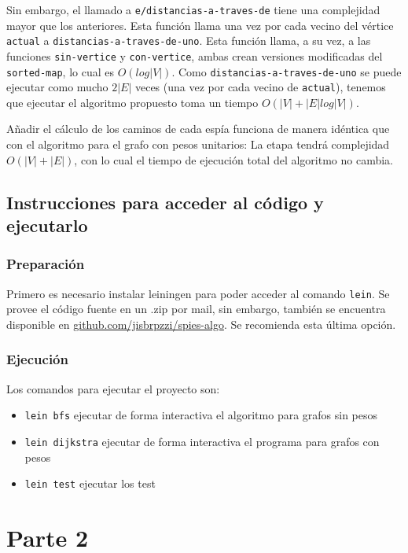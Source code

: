 \documentclass{article}
\begin{document}
Sin embargo, el llamado a \texttt{e/distancias-a-traves-de} tiene una complejidad mayor que los anteriores. Esta función llama una vez por cada vecino del vértice \texttt{actual} a \texttt{distancias-a-traves-de-uno}. Esta función llama, a su vez, a las funciones \texttt{sin-vertice} y \texttt{con-vertice}, ambas crean versiones modificadas del \texttt{sorted-map}, lo cual es $O(log |V|)$. Como \texttt{distancias-a-traves-de-uno} se puede ejecutar como mucho $2|E|$ veces (una vez por cada vecino de \texttt{actual}), tenemos que ejecutar el algoritmo propuesto toma un tiempo $O(|V| + |E| log|V|)$.

Añadir el cálculo de los caminos de cada espía funciona de manera idéntica que con el algoritmo para el grafo con pesos unitarios: La etapa tendrá complejidad $O(|V| + |E|)$, con lo cual el tiempo de ejecución total del algoritmo no cambia.

\subsection{Instrucciones para acceder al código y ejecutarlo}

\subsubsection{Preparación}
Primero es necesario instalar leiningen para poder acceder al comando \texttt{lein}. Se provee el código fuente en un .zip por mail, sin embargo, también se encuentra disponible en \href{http://github.com/jisbruzzi/spies-algo}{github.com/jisbrpzzi/spies-algo}. Se recomienda esta última opción.

\subsubsection{Ejecución}
Los comandos para ejecutar el proyecto son:

\begin{itemize}

\item \texttt{lein bfs} ejecutar de forma interactiva el algoritmo para grafos sin pesos
\item \texttt{lein dijkstra} ejecutar de forma interactiva el programa para grafos con pesos
\item \texttt{lein test} ejecutar los test

\end{itemize}

\newpage
\section{Parte 2}
\end{document}
